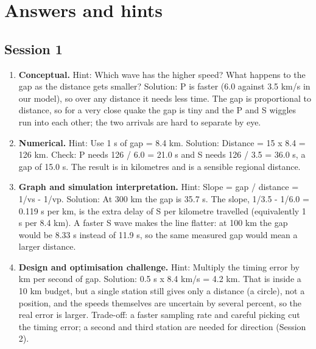 \documentclass[11pt,a4paper]{article}
\begin{document}
\section{Answers and hints}

\subsection*{Session 1}
\begin{enumerate}[nosep]
\item \textbf{Conceptual.} Hint: Which wave has the higher speed? What happens to the gap as the distance gets smaller? Solution: P is faster (6.0 against 3.5 km/s in our model), so over any distance it needs less time. The gap is proportional to distance, so for a very close quake the gap is tiny and the P and S wiggles run into each other; the two arrivals are hard to separate by eye.
\item \textbf{Numerical.} Hint: Use 1 s of gap = 8.4 km. Solution: Distance = 15 x 8.4 = 126 km. Check: P needs 126 / 6.0 = 21.0 s and S needs 126 / 3.5 = 36.0 s, a gap of 15.0 s. The result is in kilometres and is a sensible regional distance.
\item \textbf{Graph and simulation interpretation.} Hint: Slope = gap / distance = 1/vs - 1/vp. Solution: At 300 km the gap is 35.7 s. The slope, 1/3.5 - 1/6.0 = 0.119 s per km, is the extra delay of S per kilometre travelled (equivalently 1 s per 8.4 km). A faster S wave makes the line flatter: at 100 km the gap would be 8.33 s instead of 11.9 s, so the same measured gap would mean a larger distance.
\item \textbf{Design and optimisation challenge.} Hint: Multiply the timing error by km per second of gap. Solution: 0.5 s x 8.4 km/s = 4.2 km. That is inside a 10 km budget, but a single station still gives only a distance (a circle), not a position, and the speeds themselves are uncertain by several percent, so the real error is larger. Trade-off: a faster sampling rate and careful picking cut the timing error; a second and third station are needed for direction (Session 2).
\end{enumerate}
\end{document}
